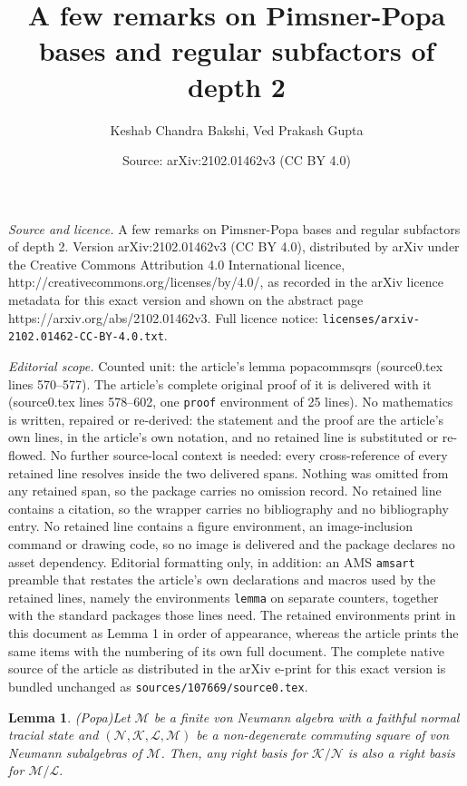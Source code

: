 \documentclass[10pt,a4paper]{amsart}
\title{A few remarks on Pimsner-Popa bases and regular subfactors of depth 2}
\author{Keshab Chandra Bakshi, Ved Prakash Gupta}
\date{Source: arXiv:2102.01462v3 (CC BY 4.0)}
\newtheorem{lemma}{Lemma}
\begin{document}
\maketitle

\noindent\emph{Source and licence.} A few remarks on Pimsner-Popa bases and regular subfactors of depth 2. Version arXiv:2102.01462v3 (CC BY 4.0), distributed by arXiv under the Creative Commons Attribution 4.0 International licence, http://creativecommons.org/licenses/by/4.0/, as recorded in the arXiv licence metadata for this exact version and shown on the abstract page https://arxiv.org/abs/2102.01462v3. Full licence notice: \texttt{licenses/arxiv-2102.01462-CC-BY-4.0.txt}.\par\smallskip

\noindent\textit{Editorial scope.} Counted unit: the article's lemma popacommsqrs (source0.tex lines 570--577). The article's complete original proof of it is delivered with it (source0.tex lines 578--602, one \texttt{proof} environment of 25 lines). No mathematics is written, repaired or re-derived: the statement and the proof are the article's own lines, in the article's own notation, and no retained line is substituted or re-flowed.  No further source-local context is needed: every cross-reference of every retained line resolves inside the two delivered spans.  Nothing was omitted from any retained span, so the package carries no omission record.  No retained line contains a citation, so the wrapper carries no bibliography and no bibliography entry.  No retained line contains a figure environment, an image-inclusion command or drawing code, so no image is delivered and the package declares no asset dependency.  Editorial formatting only, in addition: an AMS \texttt{amsart} preamble that restates the article's own declarations and macros used by the retained lines, namely the environments \texttt{lemma} on separate counters, together with the standard packages those lines need.  The retained environments print in this document as Lemma 1 in order of appearance, whereas the article prints the same items with the numbering of its own full document.  The complete native source of the article as distributed in the arXiv e-print for this exact version is bundled unchanged as \texttt{sources/107669/source0.tex}.
\begin{lemma}(Popa)\label{popacommsqrs}
 Let $\mathcal{M}$ be a finite von Neumann algebra with a faithful
 normal tracial state and
 $(\mathcal{N},\mathcal{K},\mathcal{L},\mathcal{M})$ be a
 non-degenerate commuting square of von Neumann subalgebras of
 $\mathcal{M}$. Then, any right basis for $\mathcal{K}/\mathcal{N}$ is also a
 right basis for $\mathcal{M}/\mathcal{L}.$
\end{lemma}
\end{document}
